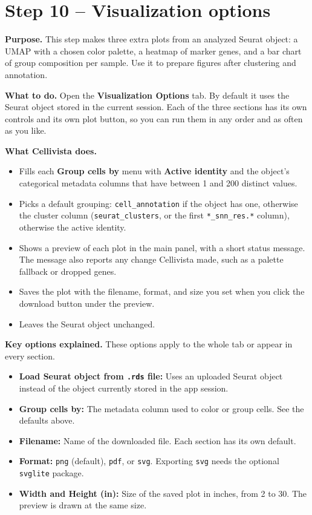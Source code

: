 \documentclass[11pt]{article}
\begin{document}
\section{Step 10 -- Visualization options}
\label{sec:viz}

\textbf{Purpose.}
This step makes three extra plots from an analyzed Seurat object: a UMAP with a chosen color palette, a heatmap of marker genes, and a bar chart of group composition per sample. Use it to prepare figures after clustering and annotation.

\textbf{What to do.}
Open the \textbf{Visualization Options} tab. By default it uses the Seurat object stored in the current session. Each of the three sections has its own controls and its own plot button, so you can run them in any order and as often as you like.

\textbf{What Cellivista does.}
\begin{itemize}
  \item Fills each \textbf{Group cells by} menu with \textbf{Active identity} and the object's categorical metadata columns that have between 1 and 200 distinct values.
  \item Picks a default grouping: \texttt{cell\_annotation} if the object has one, otherwise the cluster column (\texttt{seurat\_clusters}, or the first \texttt{*\_snn\_res.*} column), otherwise the active identity.
  \item Shows a preview of each plot in the main panel, with a short status message. The message also reports any change Cellivista made, such as a palette fallback or dropped genes.
  \item Saves the plot with the filename, format, and size you set when you click the download button under the preview.
  \item Leaves the Seurat object unchanged.
\end{itemize}

\textbf{Key options explained.}
These options apply to the whole tab or appear in every section.
\begin{itemize}
  \item \textbf{Load Seurat object from \texttt{.rds} file:} Uses an uploaded Seurat object instead of the object currently stored in the app session.
  \item \textbf{Group cells by:} The metadata column used to color or group cells. See the defaults above.
  \item \textbf{Filename:} Name of the downloaded file. Each section has its own default.
  \item \textbf{Format:} \texttt{png} (default), \texttt{pdf}, or \texttt{svg}. Exporting \texttt{svg} needs the optional \texttt{svglite} package.
  \item \textbf{Width and Height (in):} Size of the saved plot in inches, from 2 to 30. The preview is drawn at the same size.
\end{itemize}
\end{document}
